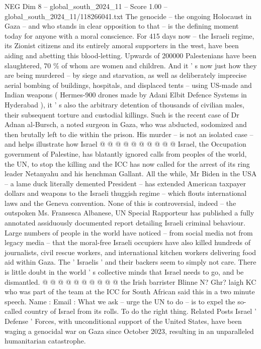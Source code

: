\begin{textsample}{NEG Dim 8 – global\_south\_2024\_11 – Score 1.00 – global\_south\_2024\_11/118266041.txt}  \label{ex:f8_neg_293}
The genocide -- the ongoing Holocaust in Gaza -- and who stands in clear opposition to that -- is the defining moment today for anyone with a moral conscience.
For 415 days now -- the Israeli regime, its Zionist citizens and its entirely amoral supporters in the west, have been aiding and abetting this blood-letting.
Upwards of 200000 Palestenians have been slaughtered, 70 \% of whom are women and children.
And it ' s now just how they are being murdered -- by siege and starvation, as well as deliberately imprecise aerial bombing of buildings, hospitals, and displaced tents -- using US-made and Indian weapons ( Hermes-900 drones made by Adani Elbit Defence Systems in Hyderabad ), it ' s also the arbitrary detention of thousands of civilian males, their subsequent torture and custodial killings.
Such is the recent case of Dr Adnan al-Bursch, a noted surgeon in Gaza, who was abducted, sodomized and then brutally left to die within the prison.
His murder -- is not an isolated case -- and helps illustrate how Israel @ @ @ @ @ @ @ @ @ @ Israel, the Occupation government of Palestine, has blatantly ignored calls from peoples of the world, the UN, to stop the killing and the ICC has now called for the arrest of its ring leader Netanyahu and his henchman Gallant.
All the while, Mr Biden in the USA -- a lame duck literally demented President -- has extended American taxpayer dollars and weapons to the Israeli thuggish regime -- which flouts international laws and the Geneva convention.
None of this is controversial, indeed -- the outspoken Ms.
Fransesca Albanese, UN Special Rapporteur has published a fully annotated assiduously documented report detailing Israeli criminal behaviour.
Large numbers of people in the world have noticed -- from social media not from legacy media -- that the moral-free Israeli occupiers have also killed hundreds of journalists, civil rescue workers, and international kitchen workers delivering food aid within Gaza.
The ' Israelis ' and their backers seem to simply not care.
There is little doubt in the world ' s collective minds that Israel needs to go, and be dismantled. @ @ @ @ @ @ @ @ @ @ the Irish barrister Blinne N?
Ghr? laigh KC who was part of the team at the ICC for South African said this in a two minute speech.
Name : Email : What we ask -- urge the UN to do -- is to expel the so-called country of Israel from its rolls.
To do the right thing.
Related Posts Israel ' Defense ' Forces, with unconditional support of the United States, have been waging a genocidal war on Gaza since October 2023, resulting in an unparalleled humanitarian catastrophe.

\end{textsample}
